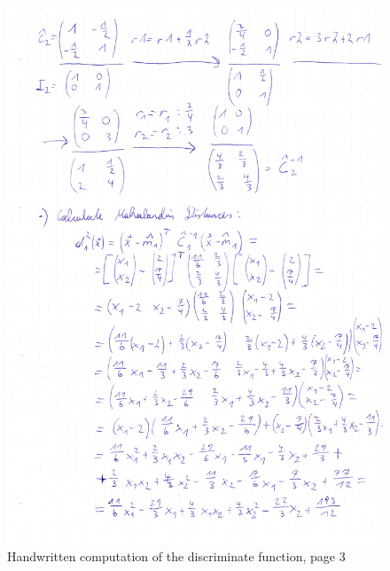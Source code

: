 \documentclass[subfigure,epsfig,fleqn,amssmb,float,caption,ausarbeitung]{scrartcl}
\begin{document}
\begin{figure}
\includegraphics[width=14cm]{img/discriminantFunction3.jpg}
	\caption{Handwritten computation of the discriminate function, page 3}
	\label{fig:hws3}
\end{figure}
\end{document}
